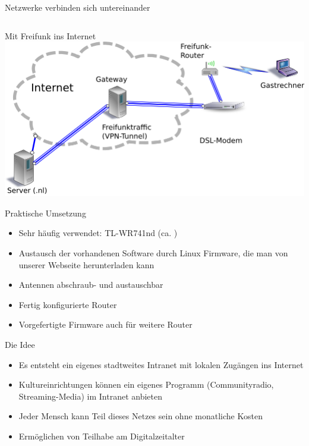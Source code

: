 \documentclass[c]{beamer}
\begin{document}
\begin{frame}{Netzwerke verbinden sich untereinander}
\begin{columns}[c]
\begin{column}[r]{.5\textwidth}
{{}}
		\end{column}
	\end{columns}
\end{frame}

\begin{frame}{Mit Freifunk ins Internet}
	\includegraphics[width=\textwidth]{Freifunk_Knotenanbindung}
\end{frame}


\begin{frame}{Praktische Umsetzung}
	\begin{itemize}
		\item Sehr häufig verwendet: TL-WR741nd (ca. )
		\item Austausch der vorhandenen Software durch Linux Firmware, die man von unserer Webseite herunterladen kann
		\item Antennen abschraub- und austauschbar
		\item Fertig konfigurierte Router
		\item Vorgefertigte Firmware auch für weitere Router
	\end{itemize}
\end{frame}

\begin{frame}{Die Idee}
	\begin{itemize}
		\item Es entsteht ein eigenes stadtweites Intranet mit lokalen Zugängen ins Internet
		\item Kultureinrichtungen können ein eigenes Programm (Communityradio, Streaming-Media) im Intranet anbieten
		\item Jeder Mensch kann Teil dieses Netzes sein ohne monatliche Kosten
		\item Ermöglichen von Teilhabe am Digitalzeitalter
	\end{itemize}
\end{frame}
\end{document}
